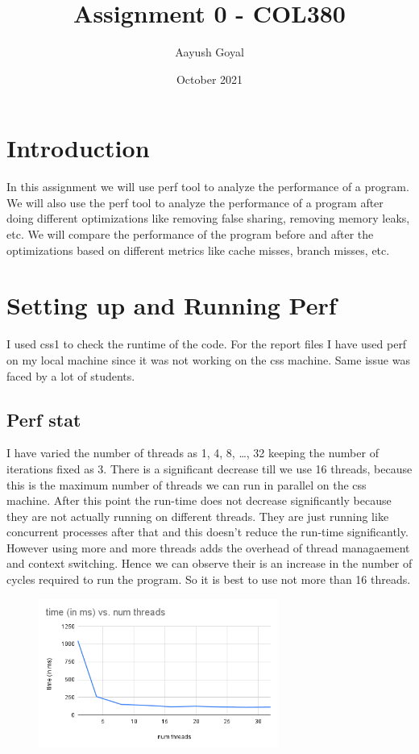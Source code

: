 \documentclass{article}
\title{Assignment 0 - COL380}
\author{Aayush Goyal}
\date{October 2021}
\begin{document}
\maketitle

\tableofcontents


\section{Introduction}
In this assignment we will use perf tool to analyze the performance of a program. We will also use the perf tool to analyze the performance of a program after doing different optimizations like removing false sharing, removing memory leaks, etc. We will compare the performance of the program before and after the optimizations based on different metrics like cache misses, branch misses, etc.

\section{Setting up and Running Perf}
I used css1 to check the runtime of the code. For the report files I have used perf on my local machine since it was not working on the css machine. Same issue was faced by a lot of students.

\subsection{Perf stat}
I have varied the number of threads as 1, 4, 8, \dots, 32 keeping the number of iterations fixed as 3. There is a significant decrease till we use 16 threads, because this is the maximum number of threads we can run in parallel on the css machine. After this point the run-time does not decrease significantly because they are not actually running on different threads. They are just running like concurrent processes after that and this doesn't reduce the run-time significantly. However using more and more threads adds the overhead of thread managaement and context switching. Hence we can observe their is an increase in the number of cycles required to run the program. So it is best to use not more than 16 threads.
\begin{figure}[H]
\centering
\includegraphics[width=0.7\textwidth]{images/time_threads.png}
\end{figure}
\end{document}
